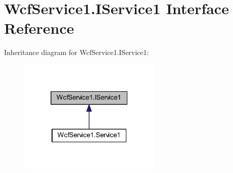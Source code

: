 \hypertarget{interface_wcf_service1_1_1_i_service1}{}\section{Wcf\+Service1.\+I\+Service1 Interface Reference}
\label{interface_wcf_service1_1_1_i_service1}


Inheritance diagram for Wcf\+Service1.\+I\+Service1\+:\nopagebreak
\begin{figure}[H]
\begin{center}
\leavevmode
\includegraphics[width=193pt]{interface_wcf_service1_1_1_i_service1__inherit__graph}
\end{center}
\end{figure}
